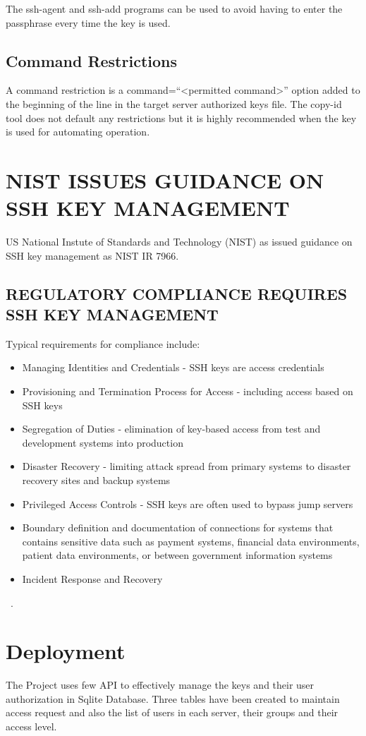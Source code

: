 The ssh-agent and ssh-add programs can be used to avoid having to 
enter the passphrase every time the key is used.

\subsection{Command Restrictions}

A command restriction is a command=``<permitted command>'' option
added to the beginning of the line in the target server authorized
keys file.  The copy-id tool does not default any restrictions but it
is highly recommended when the key is used for automating operation.

\section{NIST ISSUES GUIDANCE ON SSH KEY MANAGEMENT}
US National Instute of Standards and Technology (NIST) as issued guidance on
SSH key management as NIST IR 7966. 

\subsection{REGULATORY COMPLIANCE REQUIRES SSH KEY MANAGEMENT}
Typical requirements for compliance include:
\begin{itemize}
	\item Managing Identities and Credentials - SSH keys 
	are access credentials
	\item Provisioning and Termination Process for Access 
    - including access based on SSH keys
	\item Segregation of Duties - elimination of 
	key-based access from test and development systems into
	production
    \item Disaster Recovery - limiting attack spread
    from primary systems to disaster recovery sites and
    backup systems
    \item Privileged Access Controls - SSH keys are often used to 
    bypass jump servers
    \item Boundary definition and documentation of connections for 
    systems that contains sensitive data such as payment systems,
    financial data environments, patient data 
    environments, or between government information systems
    \item Incident Response and Recovery
\end{itemize}
~\cite{hid-sp18-513-sshkey}.

\section{Deployment}
The Project uses few API to effectively manage the keys and their
user authorization in Sqlite Database.
Three tables have been created to maintain access request and also
the list of users in each server, their groups and their access level.

